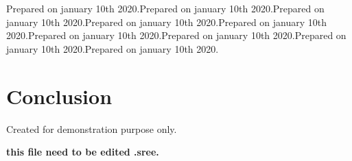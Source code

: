 \documentclass[12pt]{report} %
\begin{document}
\begin{multicols}{2}
Prepared on january 10th 2020.Prepared on january 10th 2020.Prepared on january 10th 2020.Prepared on january 10th 2020.Prepared on january 10th 2020.Prepared on january 10th 2020.Prepared on january 10th 2020.Prepared on january 10th 2020.Prepared on january 10th 2020.



\section{Conclusion} Created for demonstration purpose only.
\end{multicols}
 
\textbf {this file need to be edited .sree.}
\end{document}
